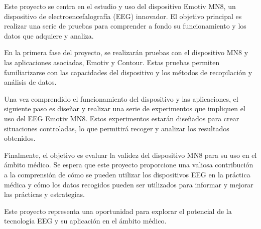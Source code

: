 
Este proyecto se centra en el estudio y uso del dispositivo Emotiv MN8, un dispositivo de electroencefalografía (EEG) innovador. El objetivo principal es realizar una serie de pruebas para comprender a fondo su funcionamiento y los datos que adquiere y analiza.

En la primera fase del proyecto, se realizarán pruebas con el dispositivo MN8 y las aplicaciones asociadas, Emotiv y Contour. Estas pruebas permiten familiarizarse con las capacidades del dispositivo y los métodos de recopilación y análisis de datos.

Una vez comprendido el funcionamiento del dispositivo y las aplicaciones, el siguiente paso es diseñar y realizar una serie de experimentos que impliquen el uso del EEG Emotiv MN8. Estos experimentos estarán diseñados para crear situaciones controladas, lo que permitirá recoger y analizar los resultados obtenidos.

Finalmente, el objetivo es evaluar la validez del dispositivo MN8 para su uso en el ámbito médico. Se espera que este proyecto proporcione una valiosa contribución a la comprensión de cómo se pueden utilizar los dispositivos EEG en la práctica médica y cómo los datos recogidos pueden ser utilizados para informar y mejorar las prácticas y estrategias.

Este proyecto representa una oportunidad para explorar el potencial de la tecnología EEG y su aplicación en el ámbito médico.
